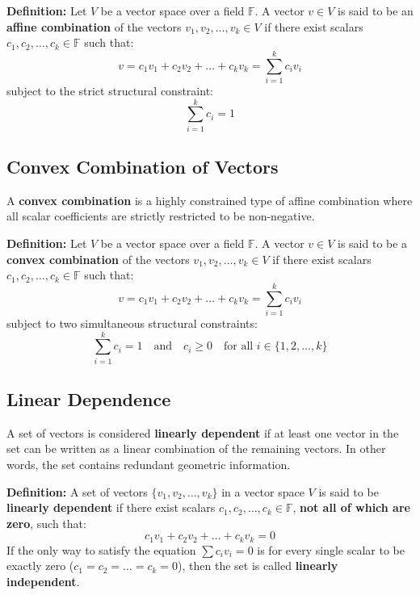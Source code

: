 \documentclass[11pt, a4paper]{article}
\begin{document}
	\noindent \textbf{Definition:} Let $V$ be a vector space over a field $\mathbb{F}$. A vector $v \in V$ is said to be an \textbf{affine combination} of the vectors $v_1, v_2, \dots, v_k \in V$ if there exist scalars $c_1, c_2, \dots, c_k \in \mathbb{F}$ such that:
	\[
	v = c_1 v_1 + c_2 v_2 + \dots + c_k v_k = \sum_{i=1}^{k} c_i v_i
	\]
	subject to the strict structural constraint:
	\[
	\sum_{i=1}^{k} c_i = 1
	\]
	
	\subsection*{Convex Combination of Vectors}
	A \textbf{convex combination} is a highly constrained type of affine combination where all scalar coefficients are strictly restricted to be non-negative.
	
	\noindent \textbf{Definition:} Let $V$ be a vector space over a field $\mathbb{F}$. A vector $v \in V$ is said to be a \textbf{convex combination} of the vectors $v_1, v_2, \dots, v_k \in V$ if there exist scalars $c_1, c_2, \dots, c_k \in \mathbb{F}$ such that:
	\[
	v = c_1 v_1 + c_2 v_2 + \dots + c_k v_k = \sum_{i=1}^{k} c_i v_i
	\]
	subject to two simultaneous structural constraints:
	\[
	\sum_{i=1}^{k} c_i = 1 \quad \text{and} \quad c_i \ge 0 \quad \text{for all } i \in \{1, 2, \dots, k\}
	\]
	
	\subsection*{Linear Dependence}
	A set of vectors is considered \textbf{linearly dependent} if at least one vector in the set can be written as a linear combination of the remaining vectors. In other words, the set contains redundant geometric information.
	
	\noindent \textbf{Definition:} A set of vectors $\{v_1, v_2, \dots, v_k\}$ in a vector space $V$ is said to be \textbf{linearly dependent} if there exist scalars $c_1, c_2, \dots, c_k \in \mathbb{F}$, \textbf{not all of which are zero}, such that:
	\[
	c_1 v_1 + c_2 v_2 + \dots + c_k v_k = 0
	\]
	If the only way to satisfy the equation $\sum c_i v_i = 0$ is for every single scalar to be exactly zero ($c_1 = c_2 = \dots = c_k = 0$), then the set is called \textbf{linearly independent}.
	
\end{document}
